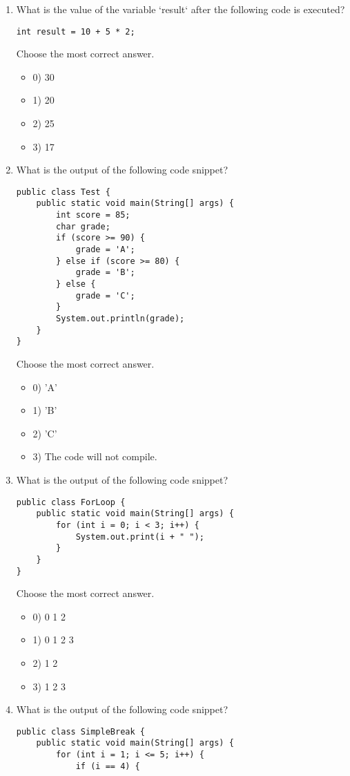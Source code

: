 \documentclass[12pt]{article}
\begin{document}
\begin{enumerate}[label=(\arabic*)]
\begin{itemize}
\end{itemize}
\item What is the value of the variable `result` after the following code is executed?\n\begin{verbatim}
int result = 10 + 5 * 2;
\end{verbatim}
Choose the most correct answer. 
\begin{itemize}
\item 0) 30
\item 1) 20
\item 2) 25
\item 3) 17
\end{itemize}
\item What is the output of the following code snippet?\n\begin{verbatim}
public class Test {
    public static void main(String[] args) {
        int score = 85;
        char grade;
        if (score >= 90) {
            grade = 'A';
        } else if (score >= 80) {
            grade = 'B';
        } else {
            grade = 'C';
        }
        System.out.println(grade);
    }
}
\end{verbatim}
Choose the most correct answer. 
\begin{itemize}
\item 0) 'A'
\item 1) 'B'
\item 2) 'C'
\item 3) The code will not compile.
\end{itemize}
\item What is the output of the following code snippet?\n\begin{verbatim}
public class ForLoop {
    public static void main(String[] args) {
        for (int i = 0; i < 3; i++) {
            System.out.print(i + " ");
        }
    }
}
\end{verbatim}
Choose the most correct answer. 
\begin{itemize}
\item 0) 0 1 2 
\item 1) 0 1 2 3 
\item 2) 1 2 
\item 3) 1 2 3 
\end{itemize}
\item What is the output of the following code snippet?\n\begin{verbatim}
public class SimpleBreak {
    public static void main(String[] args) {
        for (int i = 1; i <= 5; i++) {
            if (i == 4) {

\end{verbatim}
\end{enumerate}
\end{document}

